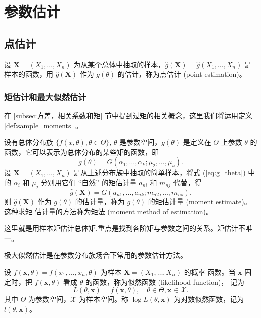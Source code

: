 \chapter{参数估计}\label{chap:参数估计}
\section{点估计}\label{sec:点估计}
\begin{definition}[点估计]\label{def:point_estimation}
设 $\mathbf{X} = (X_1, \dots, X_n)$ 为从某个总体中抽取的样本，$\hat{g}(\mathbf{X}) = \hat{g}(X_1, \dots, X_n)$ 是样本的函数，用 $\hat{g}(\mathbf{X})$ 作为 $g(\theta)$ 的估计，称为点估计 (point estimation)。
\end{definition}

\subsection{矩估计和最大似然估计}\label{subsec:矩估计和最大似然估计}
在 \ref{subsec:方差，相关系数和矩} 节中提到过矩的相关概念，这里我们将运用定义 \ref{def:sample_moments} 。

\begin{definition}[矩估计量与矩法]\label{def:moment_estimate}
设有总体分布族 $\{f(x, \theta), \theta \in \Theta\}$, $\theta$ 是参数空间，$g(\theta)$ 是定义在
$\Theta$ 上参数 $\theta$ 的函数，它可以表示为总体分布的某些矩的函数，即
\begin{equation}
g(\theta) = G(\alpha_1, \dots, \alpha_k; \mu_2, \dots, \mu_s).\label{eq:g_theta}
\end{equation}
设 $\mathbf{X} = (X_1, \dots, X_n)$ 是从上述分布族中抽取的简单样本，将式 (\ref{eq:g_theta}) 中的 $\alpha_i$ 和
$\mu_j$ 分别用它们 “自然” 的矩估计量 $a_{ni}$ 和 $m_{nj}$ 代替，得
\begin{equation}
\hat{g}(\mathbf{X}) = G(a_{n1}, \dots, a_{nk}; m_{n2}, \dots, m_{ns}).\label{eq:hat_g_X}
\end{equation}
则 $\hat{g}(\mathbf{X})$ 作为 $g(\theta)$ 的估计量，称为 $g(\theta)$ 的矩估计量 (moment estimate)。这种求矩
估计量的方法称为矩法 (moment method of estimation)。
\end{definition}
\begin{remark}
    这里就是用样本矩估计总体矩,重点是找到各阶矩与参数之间的关系。矩估计不唯一。
\end{remark}

极大似然估计是在参数分布族场合下常用的参数估计方法。

\begin{definition}[似然函数与对数似然函数]\label{def:likelihood_function}
设 $f(\mathbf{x}, \theta) = f(x_1, \dots, x_n, \theta)$ 为样本 $\mathbf{X} = (X_1, \dots, X_n)$ 的概率
函数。当 $\mathbf{x}$ 固定时，把 $f(\mathbf{x}, \theta)$ 看成 $\theta$ 的函数，称为似然函数 (likelihood function)，
记为
\begin{equation}
L(\theta, \mathbf{x}) = f(\mathbf{x}, \theta), \quad \theta \in \Theta, \mathbf{x} \in \mathcal{X}. \label{eq:likelihood_L}
\end{equation}
其中 $\Theta$ 为参数空间，$\mathcal{X}$ 为样本空间。称 $\log L(\theta, \mathbf{x})$ 为对数似然函数，记为 $l(\theta, \mathbf{x})$。
\end{definition}

